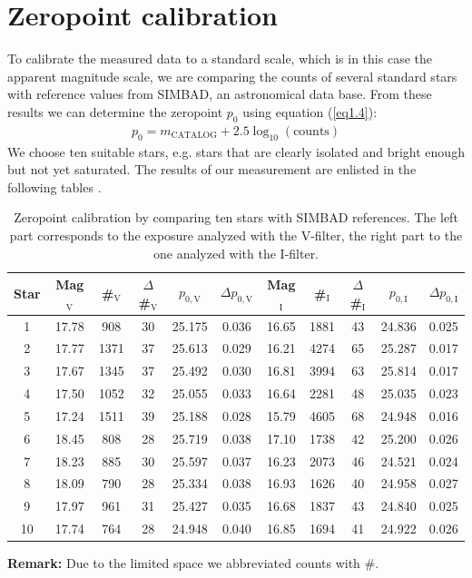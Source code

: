 \section{Zeropoint calibration}\label{sec:zeropoint}
To calibrate the measured data to a standard scale, which is in this case the apparent magnitude scale, we are comparing the counts of several standard stars with reference values from SIMBAD, an astronomical data base. From these results we can determine the zeropoint $p_0$ using equation (\ref{eq1.4}): 
	\begin{align*}
		p_0 = m_{\text{CATALOG}} + 2.5\log_{10}(\text{counts})
	\end{align*}
	We choose ten suitable stars, e.g. stars that are clearly isolated and bright enough but not yet saturated. 
\newpage
The results of our measurement are enlisted in the following tables
.
	
	\begin{table}[H]
\setlength{\tabcolsep}{2mm}
\renewcommand{\arraystretch}{1.5}
\begin{adjustbox}{width=\textwidth} 
\begin{tabular}{c|c c c c c|c c c c c}

Star & Mag$_{\text{V}}$ & \#$_{\text{V}}$ & $\Delta$\#$_{\text{V}}$ & $p_{0,\text{V}}$ &$\Delta p_{0,\text{V}}$ & Mag$_{\text{I}}$ & \#$_{\text{I}}$ & $\Delta$\#$_{\text{I}}$ & $p_{0,\text{I}}$ &$\Delta p_{0,\text{I}}$\\ \hline 
1 & 17.78 & 908 & 30 & 25.175 & 0.036 & 16.65 & 1881 & 43 & 24.836 & 0.025 \\
2 & 17.77 & 1371 & 37 & 25.613 & 0.029 & 16.21 & 4274 & 65 & 25.287 & 0.017 \\
3 & 17.67 & 1345 & 37 & 25.492 & 0.030 & 16.81 & 3994 & 63 & 25.814 & 0.017 \\
4 & 17.50 & 1052 & 32 & 25.055 & 0.033 & 16.64 & 2281 & 48 & 25.035 & 0.023 \\
5 & 17.24 & 1511 & 39 & 25.188& 0.028 & 15.79 & 4605 & 68 & 24.948 & 0.016 \\
6 & 18.45 & 808 & 28 & 25.719 & 0.038 & 17.10 & 1738 & 42 &  25.200 & 0.026 \\
7 & 18.23 & 885 & 30 & 25.597 & 0.037 & 16.23 & 2073 & 46 &  24.521 & 0.024 \\
8 & 18.09 & 790 & 28 & 25.334 & 0.038 & 16.93 & 1626 & 40 & 24.958 & 0.027 \\
9 & 17.97 & 961 & 31 & 25.427 & 0.035 & 16.68 & 1837 & 43 &  24.840 & 0.025 \\
10 & 17.74 & 764 & 28 & 24.948 & 0.040 & 16.85 &  1694 & 41 & 24.922 & 0.026 \\

\end{tabular}
\end{adjustbox}
\caption{\label{tab:2} Zeropoint calibration by comparing ten stars with SIMBAD references. The left part corresponds to the exposure analyzed with the V-filter, the right part to the one analyzed with the I-filter.}
\end{table}
\textbf{Remark:} Due to the limited space we abbreviated counts with $\#$. \\
	
